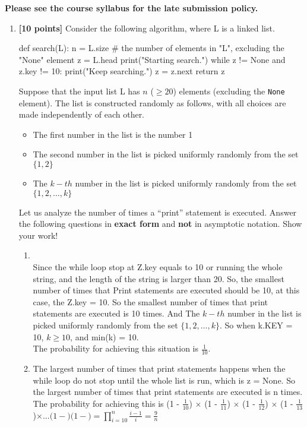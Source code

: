 \documentclass{assignment-263}
\begin{document}
\think

\textbf{Please see the course syllabus for the late submission policy.}

\begin{enumerate}
\item \textbf{[10 points]}
Consider the following algorithm, where \textrm{L} is a linked list.

\begin{python}
def search(L):
  n = L.size # the number of elements in "L", excluding the "None" element
  z = L.head
  print("Starting search.")
  while z != None and z.key != 10:
    print("Keep searching.")
    z = z.next
  return z
\end{python}

Suppose that the input list L has $n$ ($\ge 20$) elements (excluding the
\texttt{None} element). The list is constructed randomly as follows,
with all choices are made independently of each other.

\begin{itemize}
    \item The first number in the list is the number 1
    \item The second number in the list is picked uniformly randomly from the set $\{1, 2\}$
    \item The $k-th$ number in the list is picked uniformly randomly from the set $\{1, 2, \ldots, k\}$
\end{itemize}

Let us analyze the number of times a ``print'' statement is executed.
Answer the following questions in \textbf{exact form} and \textbf{not} in
asymptotic notation. Show your work!

\begin{enumerate}
\item \\
 Since the while loop stop at Z.key equals to 10 or running the whole string,
 and the length of the string is larger than 20. So, the smallest number of times
 that Print statements are executed should be 10, at this case, the Z.key = 10. So
 the smallest number of times that print statements are executed is 10 times.
 And The $k-th$ number in the list is picked uniformly randomly from the 
 set $\{1, 2, \ldots, k\}$. So when k.KEY = 10, $k \geq 10$, and min(k) = 10.\\
 The probability for achieving this situation is $\frac{1}{10}$. \\
 
\item 
The largest number of times that print statements happens when the while loop do not stop until the whole list is run, which is z = None. So the largest number of times that print statements are executed is n times.
The probability for achieving this is (1 - $\frac{1}{10}$) $\times$ (1 - $\frac{1}{11}$) $\times$ (1 - $\frac{1}{12}$) $\times$ (1 - $\frac{1}{13}$)$\times ... $\times$ (1 - $$) $\times$ (1 - $$) = \prod_{i=10}^{n} \frac{i-1}{i} = \frac{9}{n}$
\\
 

\end{enumerate}
\end{enumerate}
\end{document}
